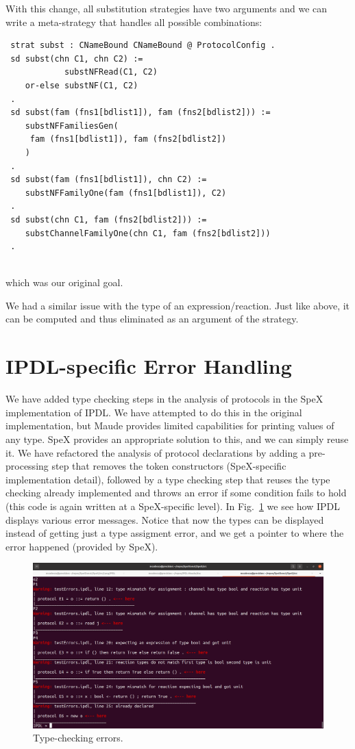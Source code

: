 \documentclass{article}
\begin{document}
With this change, all substitution strategies have two arguments
and we can write a meta-strategy that handles all 
possible combinations:
\begin{lstlisting}
 strat subst : CNameBound CNameBound @ ProtocolConfig .
 sd subst(chn C1, chn C2) :=
            substNFRead(C1, C2) 
    or-else substNF(C1, C2)
 . 
 sd subst(fam (fns1[bdlist1]), fam (fns2[bdlist2])) :=
    substNFFamiliesGen(
     fam (fns1[bdlist1]), fam (fns2[bdlist2])
    )
 . 
 sd subst(fam (fns1[bdlist1]), chn C2) :=
    substNFFamilyOne(fam (fns1[bdlist1]), C2)
 .
 sd subst(chn C1, fam (fns2[bdlist2])) :=
    substChannelFamilyOne(chn C1, fam (fns2[bdlist2]))
 .
 
\end{lstlisting}
\noindent which was our original goal. 

We had a similar issue with the type of an expression/reaction.
Just like above, it can be computed and thus
eliminated as an argument of the strategy.

\section{IPDL-specific Error Handling}

We have added type checking steps in the analysis of protocols in the SpeX implementation of IPDL. We have attempted to do this in the original 
implementation, but Maude provides limited capabilities for printing
values of any type. SpeX provides an appropriate solution to this,
and we can simply reuse it. We have refactored the analysis of
protocol declarations by adding a pre-processing step that
removes the token constructors (SpeX-specific implementation detail),
followed by a type checking step that reuses the type checking already
implemented and throws an error if some condition fails to hold (this code is again written at a SpeX-specific level).
In Fig.~\ref{fig:typing} we see how
IPDL displays various error messages. Notice that now the types can be displayed instead of getting just a type assigment error, and we get a pointer to where the error happened (provided by SpeX).

\begin{figure}[htp]
\caption{Type-checking errors.}\label{fig:typing}
\centering
\includegraphics[width=\textwidth]{typing}
\end{figure}
\end{document}
